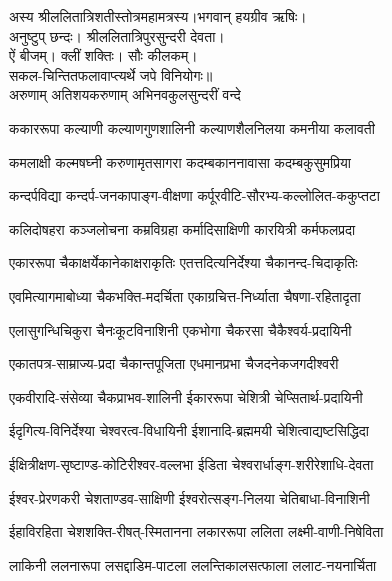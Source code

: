
अस्य  श्रीललितात्रिशतीस्तोत्रमहामत्रस्य।भगवान्  हयग्रीव  ऋषिः। \\
अनुष्टुप्  छन्दः। श्रीललितात्रिपुरसुन्दरी  देवता।\\
ऐं  बीजम्।  क्लीं  शक्तिः।  सौः  कीलकम्।\\
सकल-चिन्तितफलावाप्त्यर्थे  जपे  विनियोगः॥\\

{अरुणाम्  अतिशयकरुणाम्  अभिनवकुलसुन्दरीं  वन्दे}

\twolineshloka
{ककाररूपा कल्याणी कल्याणगुणशालिनी}
{कल्याणशैलनिलया कमनीया कलावती}

\twolineshloka
{कमलाक्षी कल्मषघ्नी करुणामृतसागरा}
{कदम्बकाननावासा कदम्बकुसुमप्रिया}

\twolineshloka
{कन्दर्पविद्या कन्दर्प-जनकापाङ्ग-वीक्षणा}
{कर्पूरवीटि-सौरभ्य-कल्लोलित-ककुप्तटा}

\twolineshloka
{कलिदोषहरा कञ्जलोचना कम्रविग्रहा}
{कर्मादिसाक्षिणी कारयित्री कर्मफलप्रदा}

\twolineshloka
{एकाररूपा चैकाक्षर्येकानेकाक्षराकृतिः}
{एतत्तदित्यनिर्देश्या चैकानन्द-चिदाकृतिः}

\twolineshloka
{एवमित्यागमाबोध्या चैकभक्ति-मदर्चिता}
{एकाग्रचित्त-निर्ध्याता चैषणा-रहितादृता}

\twolineshloka
{एलासुगन्धिचिकुरा चैनःकूटविनाशिनी}
{एकभोगा चैकरसा चैकैश्वर्य-प्रदायिनी}

\twolineshloka
{एकातपत्र-साम्राज्य-प्रदा चैकान्तपूजिता}
{एधमानप्रभा चैजदनेकजगदीश्वरी}

\twolineshloka
{एकवीरादि-संसेव्या चैकप्राभव-शालिनी}
{ईकाररूपा चेशित्री चेप्सितार्थ-प्रदायिनी}

\twolineshloka
{ईदृगित्य-विनिर्देश्या चेश्वरत्व-विधायिनी}
{ईशानादि-ब्रह्ममयी चेशित्वाद्यष्टसिद्धिदा}

\twolineshloka
{ईक्षित्रीक्षण-सृष्टाण्ड-कोटिरीश्वर-वल्लभा}
{ईडिता चेश्वरार्धाङ्ग-शरीरेशाधि-देवता}

\twolineshloka
{ईश्वर-प्रेरणकरी चेशताण्डव-साक्षिणी}
{ईश्वरोत्सङ्ग-निलया चेतिबाधा-विनाशिनी}

\twolineshloka
{ईहाविरहिता चेशशक्ति-रीषत्‌-स्मितानना}
{लकाररूपा ललिता लक्ष्मी-वाणी-निषेविता}

\twolineshloka
{लाकिनी ललनारूपा लसद्दाडिम-पाटला}
{ललन्तिकालसत्फाला ललाट-नयनार्चिता}

